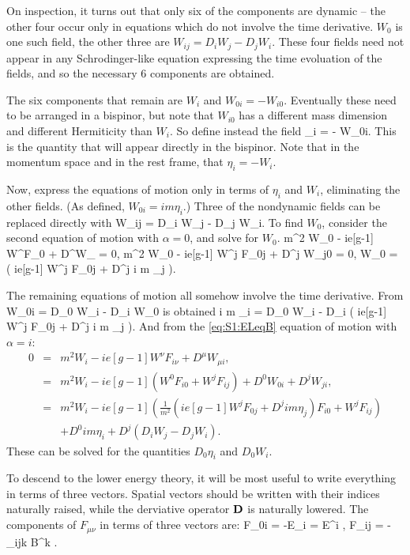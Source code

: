On inspection, it turns out that only six of the components are dynamic -- the other four occur only in equations which do not involve the time derivative.  $W_0$ is one such field, the other three are $W_{ij} = D_i W_j - D_j W_i$.  These four fields need not appear in any Schrodinger-like equation expressing the time evoluation of the fields, and so the necessary 6 components are obtained.

The six components that remain are $W_i$ and $W_{0i} = - W_{i0}$.  Eventually these need to be arranged in a bispinor, but note that $W_{i0}$ has a different mass dimension and different Hermiticity than $W_i$.  So define instead the field
\beq
	\eta_i = -  W_{0i}.
\eeq
This is the quantity that will appear directly in the bispinor.  Note that in the momentum space and in the rest frame, that $\eta_i = - W_i$.  

Now, express the equations of motion only in terms of $\eta_i$ and $W_i$, eliminating the other fields.  (As defined, $W_{0i} =  im\eta_i$.)  Three of the nondynamic fields can be replaced directly with
\beq
	W_{ij} = D_i W_j - D_j W_i.
\eeq
To find $W_0$, consider the second equation of motion with $\alpha=0$, and solve for $W_0$. 
\beq
	m^2 W_0 - ie[g-1] W^\nu F_{0\nu} + D^\mu W_{} = 0,
\eeq
\beq
	m^2 W_0 - ie[g-1] W^j F_{0j} + D^j W_{j0} = 0,
\eeq
\beq
	W_0 =  \left( ie[g-1] W^j F_{0j} + D^j   i m \eta_j \right ).
\eeq

The remaining equations of motion all somehow involve the time derivative.
From
\beq
	W_{0i} = D_0 W_i - D_i W_0
\eeq
is obtained
\beq \label{eq:S1:wA}
	i m  \eta_i = D_0 W_i - D_i  \left( ie[g-1] W^j F_{0j} + D^j i m \eta_j \right ).
\eeq
And from the \eqref{eq:S1:ELeqB} equation of motion with $\alpha=i$:
\begin{eqnarray}
	0 &=& m^2 W_i - ie [g-1] W^\nu F_{i \nu} + D^\mu W_{\mu i} ,	\\
	 &=& m^2 W_i - ie[g-1] \left( W^0 F_{i0} + W^j F_{ij} \right ) 	
		+ D^0 W_{0i} + D^j W_{ji} ,	\\
 \label{eq:S1:etaA}
	  &=&  m^2 W_i - ie[g-1] \left( \frac{1}{m^2} \left( ie[g-1] W^j F_{0j} + D^j im \eta_j \right ) F_{i0} + W^j F_{ij} \right ) 
		\\&& + D^0 im \eta_i + D^j \left( D_i W_j - D_j W_i \right ) .
\end{eqnarray}
These can be solved for the quantities $D_0 \eta_i$ and $D_0 W_i$.


To descend to the lower energy theory, it will be most useful to write everything in terms of three vectors.  Spatial vectors should be written with their indices naturally raised, while the derviative operator $\mathbf{D}$ is naturally lowered.  The components of $F_{\mu\nu}$ in terms of three vectors are:
\beq 
	F_{0i} = -E_i = E^i , \; F_{ij} = -\epsilon_{ijk} B^k .
\eeq

